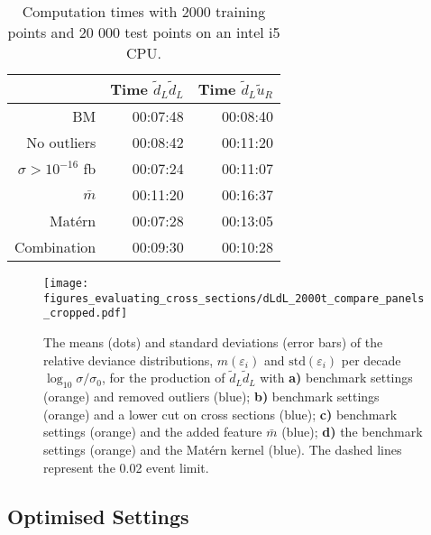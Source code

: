 \documentclass[twoside,english]{uiofysmaster}
\begin{document}
{{ 
 
 
\begin{table}
\centering
\begin{tabular}{@{}rrr@{}} \toprule
& Time $\widetilde{d}_L \widetilde{d}_L$ & Time $\widetilde{d}_L \widetilde{u}_R$\\
\midrule
BM & 00:07:48 & 00:08:40\\
No outliers & 00:08:42 & 00:11:20\\
$\sigma > 10^{-16}$ fb & 00:07:24 & 00:11:07\\
$\bar{m}$ & 00:11:20 & 00:16:37\\
Mat\'{e}rn & 00:07:28 & 00:13:05\\ 
Combination & 00:09:30 & 00:10:28\\
\bottomrule
\end{tabular}
\caption{Computation times with 2000 training points and 20 000 test points on an intel i5 CPU.}
\label{Tab:: evaluating cross : computation times BM}
\end{table}

\begin{figure}
\texttt{[image: figures\_evaluating\_cross\_sections/dLdL\_2000t\_compare\_panels\_cropped.pdf]}
\caption[Relative deviance distributions for different GP estimators]{The means (dots) and standard deviations (error bars) of the relative deviance distributions, $m(\varepsilon_i)$ and $\mathrm{std}(\varepsilon_i)$ per decade $\log_{10} \sigma/ \sigma_0$, for the production of $\widetilde{d}_L \widetilde{d}_L$ with \textbf{a)} benchmark settings (orange) and removed outliers (blue); \textbf{b)} benchmark settings (orange) and a lower cut on cross sections (blue); \textbf{c)} benchmark settings (orange) and the added feature $\bar{m}$ (blue); \textbf{d)} the benchmark settings (orange) and the Mat\'{e}rn kernel (blue). The dashed lines represent the 0.02 event limit.}
\label{Fig:: evaluating cross : RD compare panels dLdL}
\end{figure}


\subsection{Optimised Settings}\label{Sec:: evaluating cross : Optimal Settings}

}}
\end{document}
